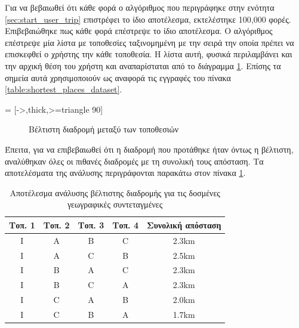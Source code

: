 \documentclass[oneside, 12pt]{book}
\begin{document}
Για να βεβαιωθεί ότι κάθε φορά ο αλγόριθμος που περιγράφηκε στην 
ενότητα \ref{sec:start_user_trip} επιστρέφει το ίδιο αποτέλεσμα, 
εκτελέστηκε 100,000 φορές. Επιβεβαιώθηκε πως κάθε φορά επέστρεψε το ίδιο 
αποτέλεσμα.
Ο αλγόριθμος επέστρεψε μία λίστα με τοποθεσίες 
ταξινομημένη με την σειρά την οποία πρέπει να επισκεφθεί ο χρήστης 
την κάθε τοποθεσία. Η λίστα αυτή, φυσικά περιλαμβάνει και την 
αρχική θέση του χρήστη και αναπαρίσταται από το διάγραμμα \ref{fig:shortest_path_dataset_plain}. Επίσης τα σημεία αυτά 
χρησιμοποιούν ως αναφορά τις εγγραφές του πίνακα 
\ref{table:shortest_places_dataset}.

 = [->,thick,>=triangle 90]

\begin{figure}[h]
\centering
{}
\caption{\label{fig:shortest_path_dataset_plain} Βέλτιστη διαδρομή μεταξύ των τοποθεσιών}
\end{figure}

Έπειτα, για να επιβεβαιωθεί ότι η διαδρομή που προτάθηκε ήταν όντως 
η βέλτιστη, αναλύθηκαν όλες οι πιθανές διαδρομές με τη συνολική τους απόσταση. Τα αποτελέσματα της ανάλυσης περιγράφονται παρακάτω στον πίνακα \ref{table:shortest_places_dataset_analysis}.

\begin{table}[H]
\centering
    \begin{tabular}{|c|c|c|c|c|}
        \hline
        \textbf{Τοπ. 1} & \textbf{Τοπ. 2} & \textbf{Τοπ. 3} & \textbf{Τοπ. 4} &  \textbf{Συνολική απόσταση} \\
        \hline
        I & A & B & C & 2.3km \\
        \hline
        I & A & C & B & 2.5km \\
        \hline
        I & B & A & C & 2.3km \\
        \hline
        I & B & C & A & 2.3km \\
        \hline
        I & C & A & B & 2.0km \\
        \hline
        \rowcolor{yellow!40} I & C & B & A & 1.7km \\
        \hline
    \end{tabular}
    \caption{Αποτέλεσμα ανάλυσης βέλτιστης διαδρομής για τις δοσμένες γεωγραφικές συντεταγμένες\label{table:shortest_places_dataset_analysis}}
\end{table}
\end{document}
